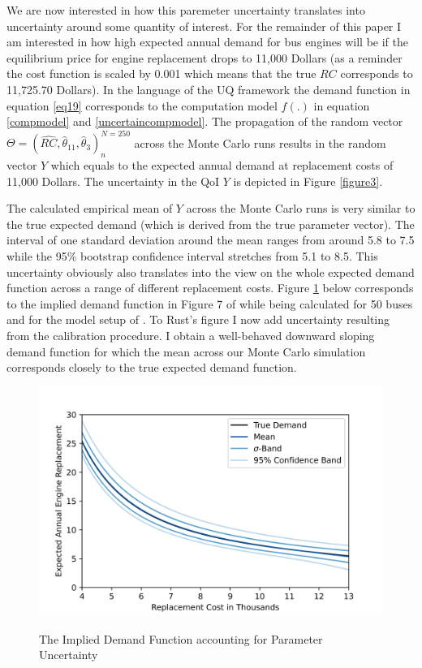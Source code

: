 We are now interested in how this paremeter uncertainty translates into uncertainty around some quantity of interest. For the remainder of this paper I am interested in how high expected annual demand for bus engines will be if the equilibrium price for engine replacement drops to 11,000 Dollars (as a reminder the cost function is scaled by 0.001 which means that the true $RC$ corresponds to 11,725.70 Dollars). In the language of the UQ framework the demand function in equation \ref{eq19} corresponds to the computation model $f(.)$ in equation \ref{compmodel} and \ref{uncertaincompmodel}. The propagation of the random vector $\Theta = (\hat{RC}, \hat\theta_{11}, \hat\theta_3)^{N=250}_n$ across the Monte Carlo runs results in the random vector $Y$ which equals to the expected annual demand at replacement costs of 11,000 Dollars. The uncertainty in the QoI $Y$ is depicted in Figure \ref{figure3}.


The calculated empirical mean of $Y$ across the Monte Carlo runs is very similar to the true expected demand (which is derived from the true parameter vector). The interval of one standard deviation around the mean ranges from around 5.8 to 7.5 while the 95\% bootstrap confidence interval stretches from 5.1 to 8.5. This uncertainty obviously also translates into the view on the whole expected demand function across a range of different replacement costs. Figure \ref{figure4} below corresponds to the implied demand function in Figure 7 of \cite{Rust.1987} while being calculated for 50 buses and for the model setup of \cite{Iskhakov.2016}. To Rust's figure I now add uncertainty resulting from the calibration procedure. I obtain a well-behaved downward sloping demand function for which the mean across our Monte Carlo simulation corresponds closely to the true expected demand function.

\begin{figure}[H]
	\caption{The Implied Demand Function accounting for Parameter Uncertainty}
	\vspace*{-4mm}
	\centering
	\includegraphics[scale=0.9]{../figures/figure_4.png}
	\label{figure4}
\end{figure}

